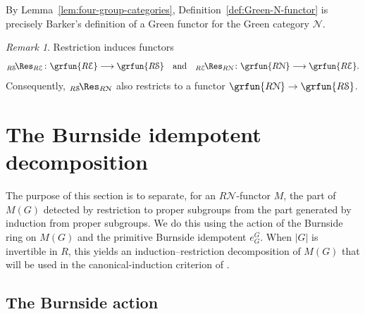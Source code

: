 \documentclass{amsart}
\numberwithin{equation}{section}%
\theoremstyle{remark}
\newtheorem{Rem}[equation]{Remark}
\theoremstyle{definition}
\newcommand{\e}{\mathcal E}
\newcommand{\s}{\mathcal S}
\newcommand{\n}{\mathcal N}
\newcommand{\iRes}[2]{{}_{#1}\!\Res_{#2}}
\begin{document}
%
By Lemma~\ref{lem:four-group-categories},
Definition~\ref{def:Green-N-functor} is precisely Barker's
definition of a Green functor for the Green category $\mathcal N$.
%
\begin{Rem}
\label{rem:Green-restrictions}
Restriction induces functors
\[
\iRes{R\s}{R\e}
\colon
\grfun{R\e}\longrightarrow\grfun{R\s}
\quad \text{and}\quad \iRes{R\e}{R\n}
\colon
\grfun{R\n}\longrightarrow\grfun{R\e}. 
\]
%
Consequently,
$\iRes{R\s}{R\n}$
also restricts to a functor
$\grfun{R\n}\to\grfun{R\s}$.
\end{Rem}
%


%
\section{The Burnside idempotent decomposition}
\label{sec:Burnside-idempotent-decomposition}
%

The purpose of this section is to separate, for an $R\n$-functor $M$,
the part of $M(G)$ detected by restriction to proper subgroups from the
part generated by induction from proper subgroups. We do this using
the action of the Burnside ring on $M(G)$ and the primitive
Burnside idempotent $e_G^G$. When $|G|$ is invertible in $R$, this
yields an induction--restriction decomposition of $M(G)$ that will be
used in the canonical-induction criterion of
.

%
\subsection{The Burnside action}\
\label{ssec:Burnside-action}
%
\end{document}
